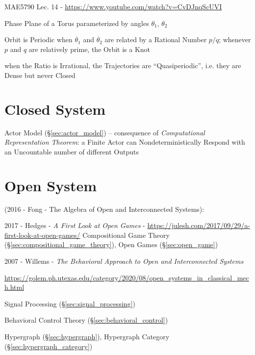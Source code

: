 MAE5790 Lec. 14 - \url{https://www.youtube.com/watch?v=CvDJnqScUVI}

Phase Plane of a Torus parameterized by angles $\theta_1$, $\theta_2$

Orbit is Periodic when $\dot{\theta_1}$ and $\dot{\theta_2}$ are related by a
Rational Number $p/q$; whenever $p$ and $q$ are relatively prime, the Orbit is a
Knot

when the Ratio is Irrational, the Trajectories are ``Quasiperiodic'', i.e. they
are Dense but never Closed



\section{Closed System}\label{sec:closed_system}


Actor Model (\S\ref{sec:actor_model}) -- consequence of \emph{Computational
  Representation Theorem}: a Finite Actor can Nondeterministically Respond with
an Uncountable number of different Outputs %



\section{Open System}\label{sec:open_system}

(2016 - Fong - The Algebra of Open and Interconnected Systems):

2017 - Hedges - \emph{A First Look at Open Games} -
\url{https://julesh.com/2017/09/29/a-first-look-at-open-games/} \fist
Compositional Game Theory (\S\ref{sec:compositional_game_theory}), Open Games
(\S\ref{sec:open_game})

2007 - Willems - \emph{The Behavioral Approach to Open and Interconnected
  Systems}

\url{https://golem.ph.utexas.edu/category/2020/08/open_systems_in_classical_mech.html}

\fist Signal Processing (\S\ref{sec:signal_processing})

\fist Behavioral Control Theory (\S\ref{sec:behavioral_control})

\fist Hypergraph (\S\ref{sec:hypergraph}), Hypergraph Category
(\S\ref{sec:hypergraph_category})

